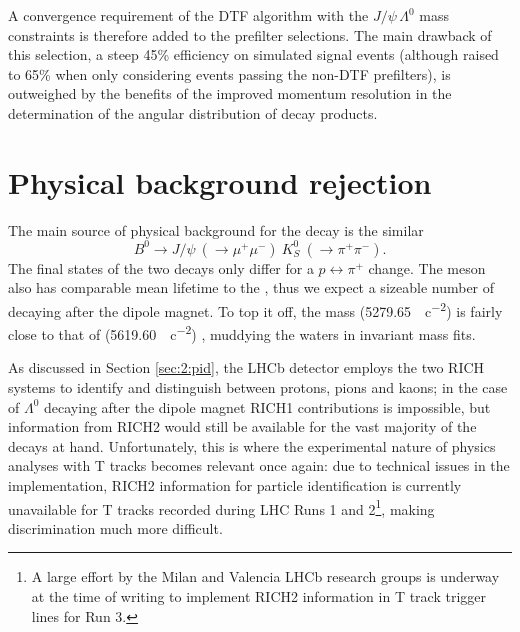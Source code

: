 A convergence requirement of the DTF algorithm with the $J/\psi\,\Lambda^0$ mass constraints is therefore added to the prefilter selections.
The main drawback of this selection, a steep 45\% efficiency on simulated signal events (although raised to 65\% when only considering events passing the non-DTF prefilters), is outweighed by the benefits of the improved momentum resolution in the determination of the angular distribution of \lambdadecay decay products.

\section{Physical background rejection}
\label{sec:4:phys_bkg}

The main source of physical background for the \demonstratorfull decay is the similar
\begin{equation}
	B^0 \rightarrow J/\psi~(\rightarrow \mu^+ \mu^-)~K_S^0~(\rightarrow \pi^+ \pi^-).
\end{equation}
The final states of the two decays only differ for a $p \leftrightarrow \pi^+$ change.
The \kshort meson also has comparable mean lifetime to the \lz, thus we expect a sizeable number of \kshort decaying after the dipole magnet.
To top it off, the \bz mass (\SI{5279.65}{\mev\per c\squared}) is fairly close to that of \lbz (\SI{5619.60}{\mev\per c\squared}) \cite{PDG}, muddying the waters in invariant mass fits.

As discussed in Section \ref{sec:2:pid}, the LHCb detector employs the two RICH systems to identify and distinguish between protons, pions and kaons;
in the case of $\Lambda^0$ decaying after the dipole magnet RICH1 contributions is impossible, but information from RICH2 would still be available for the vast majority of the decays at hand.
Unfortunately, this is where the experimental nature of physics analyses with T tracks becomes relevant once again:
due to technical issues in the implementation, RICH2 information for particle identification is currently unavailable for T tracks recorded during LHC Runs 1 and 2\footnote{A large effort by the Milan and Valencia LHCb research groups is underway at the time of writing to implement RICH2 information in T track trigger lines for Run 3.}, making \physbkgshort discrimination much more difficult.

